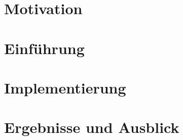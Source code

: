 \documentclass{scrreprt}
\begin{document}
  \chapter{Motivation}
  \section{}
  \chapter{Einführung}
  \chapter{Implementierung}
  \chapter{Ergebnisse und Ausblick}
  \lipsum
\end{document}
